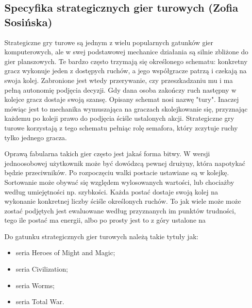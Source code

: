 \subsection{Specyfika strategicznych gier turowych (Zofia Sosińska)}
Strategiczne gry turowe są jednym z wielu popularnych gatunków gier komputerowych, ale w swej podstawowej mechanice działania są silnie zbliżone do
gier planszowych. Te bardzo często trzymają się określonego schematu: konkretny gracz wykonuje jeden z dostępych ruchów, a jego współgracze patrzą i czekają 
na swoja kolej. Zabronione jest wtedy przerywanie, czy przeszkadzaniu mu i ma pełną autonomię podjęcia decyzji. Gdy dana osoba zakończy ruch następny w kolejce gracz 
dostaje swoją szansę. Opisany schemat nosi nazwę "tury". Inaczej mówiąc jest to mechanika wymuszająca na graczach skolejkowanie się, przyznając każdemu po koleji  
prawo do podjęcia ściśle ustalonych akcji. Strategiczne gry turowe korzystają z tego schematu pełniąc rolę semafora, który zczytuje ruchy tylko jednego gracza.

Oprawą fabularna takich gier często jest jakaś forma bitwy. W wersji jednoosobowej użytkownik może być dowódzcą pewnej drużyny, która napotykać będzie przeciwników. Po 
rozpoczęciu walki postacie ustawiane są w kolejkę. Sortowanie może obywać się względem wylosowanych wartości, lub chociażby według umiejętności np. szybkości. Każda postać
 dostaje swoją kolej na wykonanie konkretnej liczby ściśle określonych ruchów. To jak wiele może może zostać podjętych jest ewaluowane według przyznanych im punktów 
 trudności, tego ile postać ma energii, albo po prosty jest to z góry ustalone na 

Do gatunku strategicznych gier turowych należą takie tytuły jak:
\begin{itemize}
  \item seria Heroes of Might and Magic;
  \item seria Civilization;
  \item seria Worms;
  \item seria Total War.
\end{itemize}

